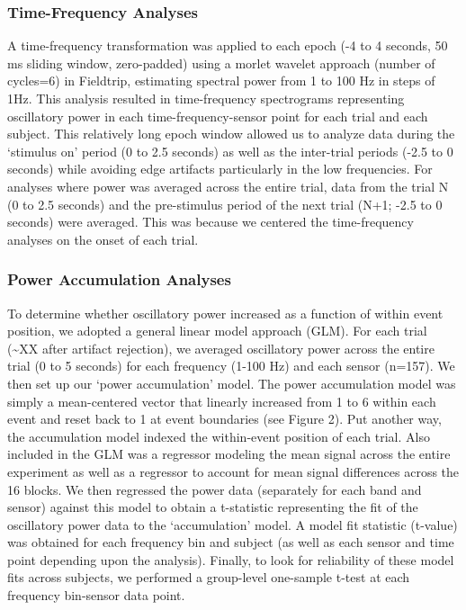 \subsubsection{Time-Frequency Analyses}\label{time-frequency-analyses}

A time-frequency transformation was applied to each epoch (-4 to 4
seconds, 50 ms sliding window, zero-padded) using a morlet wavelet
approach (number of cycles=6) in Fieldtrip, estimating spectral power
from 1 to 100 Hz in steps of 1Hz. This analysis resulted in
time-frequency spectrograms representing oscillatory power in each
time-frequency-sensor point for each trial and each subject. This
relatively long epoch window allowed us to analyze data during the
`stimulus on' period (0 to 2.5 seconds) as well as the inter-trial
periods (-2.5 to 0 seconds) while avoiding edge artifacts particularly
in the low frequencies. For analyses where power was averaged across the
entire trial, data from the trial N (0 to 2.5 seconds) and the
pre-stimulus period of the next trial (N+1; -2.5 to 0 seconds) were
averaged. This was because we centered the time-frequency analyses on
the onset of each trial.

\subsubsection{Power Accumulation
Analyses}\label{power-accumulation-analyses}

To determine whether oscillatory power increased as a function of within
event position, we adopted a general linear model approach (GLM). For
each trial (\textasciitilde{}XX after artifact rejection), we averaged
oscillatory power across the entire trial (0 to 5 seconds) for each
frequency (1-100 Hz) and each sensor (n=157). We then set up our `power
accumulation' model. The power accumulation model was simply a
mean-centered vector that linearly increased from 1 to 6 within each
event and reset back to 1 at event boundaries (see Figure 2). Put
another way, the accumulation model indexed the within-event position of
each trial. Also included in the GLM was a regressor modeling the mean
signal across the entire experiment as well as a regressor to account
for mean signal differences across the 16 blocks. We then regressed the
power data (separately for each band and sensor) against this model to
obtain a t-statistic representing the fit of the oscillatory power data
to the `accumulation' model. A model fit statistic (t-value) was
obtained for each frequency bin and subject (as well as each sensor and
time point depending upon the analysis). Finally, to look for
reliability of these model fits across subjects, we performed a
group-level one-sample t-test at each frequency bin-sensor data point.

